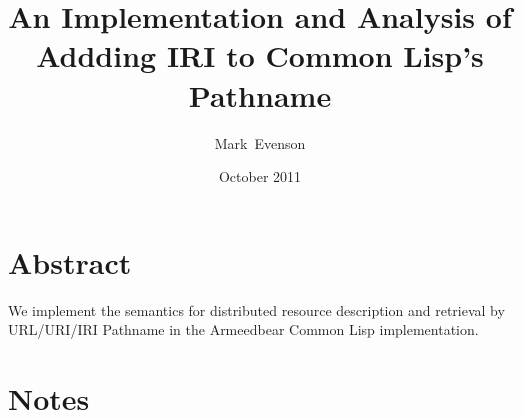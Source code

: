 \documentclass[10pt]{article}
\begin{document}
\title{An Implementation and Analysis of Addding IRI to Common Lisp's Pathname}
\date{October 2011}
\author{Mark~Evenson}

\maketitle

\section{Abstract}

We implement the semantics for distributed resource description and
retrieval by URL/URI/IRI Pathname in the Armeedbear Common Lisp implementation.

\section{Notes}

\end{document}
